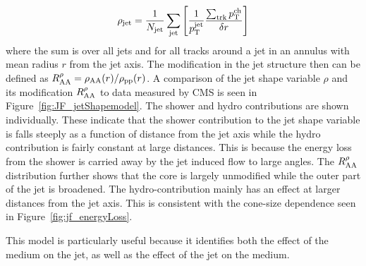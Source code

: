 \begin{align}
\rho_{\rm jet} = \frac{1}{\mbox{$N_{\mathrm{jet}}$}} \sum_{\rm jet} \left[ \frac{1}{\mbox{$p_{\mathrm{T}}^{\mathrm{jet}}$}} \frac{\sum_{\rm trk} \mbox{$p_{\mathrm{T}}^{\mathrm{ch}}$}}{\delta r}  \right]
\end{align}
where the sum is over all jets and for all tracks around a jet in an annulus with mean radius $r$ from the jet axis.
The modification in the jet structure then can be defined as $R_{\rm AA}^\rho = \rho_{\rm AA} (r) / \rho_{\rm pp} (r) $.
%
A comparison of the jet shape variable $\rho$ and its modification $R_{\rm AA}^\rho$ to data measured by CMS is seen in Figure~\ref{fig:JF_jetShapemodel}.
The shower and hydro contributions are shown individually.
These indicate that the shower contribution to the jet shape variable is falls steeply as a function of distance from the jet axis while the hydro contribution is fairly constant at large distances.
This is because the energy loss from the shower is carried away by the jet induced flow to large angles.
The $R_{\rm AA}^\rho$ distribution further shows that the core is largely unmodified while the outer part of the jet is broadened.
The hydro-contribution mainly has an effect at larger distances from the jet axis.
This is consistent with the cone-size dependence seen in Figure~\ref{fig:jf_energyLoss}.

This model is particularly useful because it identifies both the effect of the medium on the jet, as well as the effect of the jet on the medium.

